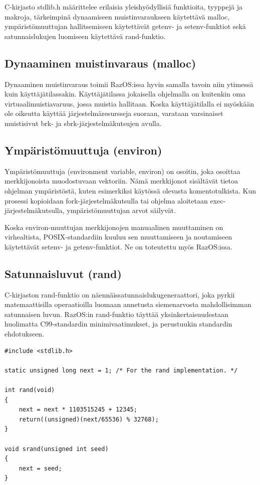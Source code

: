 C-kirjasto stdlib.h määrittelee erilaisia yleishyödyllisiä funktioita, tyyppejä ja makroja, tärkeimpinä dynaamiseen muistinvaraukseen käytettävä malloc, ympäristömuuttujan hallitsemiseen käytettävät getenv- ja setenv-funktiot sekä satunnaislukujen luomiseen käytettävä rand-funktio.

\subsection{Dynaaminen muistinvaraus (malloc)}

Dynaaminen muistinvaraus toimii RazOS:issa hyvin samalla tavoin niin ytimessä kuin käyttäjätilassakin. Käyttäjätilassa jokaisella ohjelmalla on kuitenkin oma virtuaalimuistiavaruus, jossa muistia hallitaan. Koska käyttäjätilalla ei myöskään ole oikeutta käyttää järjestelmäresursseja suoraan, varataan varsinaiset muistisivut brk- ja sbrk-järjestelmäkutsujen avulla.

\subsection{Ympäristömuuttuja (environ)}

Ympäristömuuttuja (environment variable, environ) on osoitin, joka osoittaa merkkijonoista muodostuvaan vektoriin. Nämä merkkijonot sisältävät tietoa ohjelman ympäristöstä, kuten esimerkiksi käytössä olevasta komentotulkista. Kun prosessi kopioidaan fork-järjestelmäkutsulla tai ohjelma aloitetaan exec-järjestelmäkutsulla, ympäristömuuttujan arvot säilyvät.

\par

Koska environ-muuttujan merkkijonojen manuaalinen muuttaminen on virhealtista, POSIX-standardiin kuuluu sen muuttamiseen ja noutamiseen käytettävät setenv- ja getenv-funktiot. Ne on toteutettu myös RazOS:issa.

\subsection{Satunnaisluvut (rand)}

C-kirjaston rand-funktio on näennäissatunnaislukugeneraattori, joka pyrkii matemaattisilla operaatioilla luomaan annetusta siemenarvosta mahdollisimman satunnaisen luvun. RazOS:in rand-funktio täyttää yksinkertaisuudestaan huolimatta C99-standardin minimivaatimukset, ja perustuukin standardin ehdotukseen.

\begin{footnotesize}
\begin{verbatim}
#include <stdlib.h>

static unsigned long next = 1; /* For the rand implementation. */

int rand(void)
{
	next = next * 1103515245 + 12345;
	return((unsigned)(next/65536) % 32768);
}

void srand(unsigned int seed)
{
	next = seed;
}
\end{verbatim}
\end{footnotesize}

